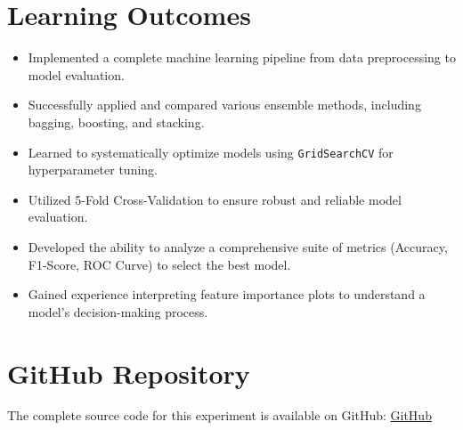 \documentclass[12pt]{article}
\begin{document}
\section{Learning Outcomes}
\begin{itemize}
    \item Implemented a complete machine learning pipeline from data preprocessing to model evaluation.
    \item Successfully applied and compared various ensemble methods, including bagging, boosting, and stacking.
    \item Learned to systematically optimize models using \texttt{GridSearchCV} for hyperparameter tuning.
    \item Utilized 5-Fold Cross-Validation to ensure robust and reliable model evaluation.
    \item Developed the ability to analyze a comprehensive suite of metrics (Accuracy, F1-Score, ROC Curve) to select the best model.
    \item Gained experience interpreting feature importance plots to understand a model's decision-making process.
\end{itemize}

\section*{GitHub Repository}
The complete source code for this experiment is available on GitHub:
\href{https://github.com/yuvashreeph/Machine-Learning/tree/main/Assignment4}{GitHub}
\end{document}
